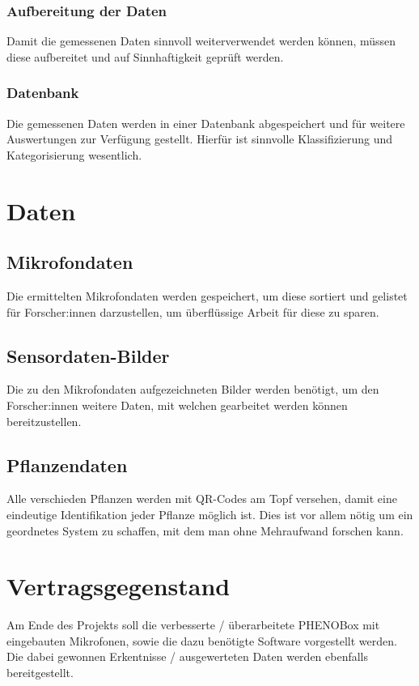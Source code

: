 \documentclass[12pt]{article}
\begin{document}
        \subsubsection{Aufbereitung der Daten}
        Damit die gemessenen Daten sinnvoll weiterverwendet werden können, müssen diese aufbereitet und auf Sinnhaftigkeit geprüft werden.
        \subsubsection{Datenbank}
        Die gemessenen Daten werden in einer Datenbank abgespeichert und für weitere Auswertungen zur Verfügung gestellt. Hierfür ist sinnvolle \Gls{Klassifizierung} und Kategorisierung wesentlich.
    
\section{Daten}
    \subsection{Mikrofondaten}
    Die ermittelten Mikrofondaten werden gespeichert, um diese sortiert und gelistet für Forscher:innen darzustellen, um überflüssige Arbeit für diese zu sparen.
    \subsection{Sensordaten-Bilder}
    Die zu den Mikrofondaten aufgezeichneten Bilder werden benötigt, um den Forscher:innen weitere Daten, mit welchen gearbeitet werden können bereitzustellen. 
    \subsection{Pflanzendaten}
    Alle verschieden Pflanzen werden mit QR-Codes am Topf versehen, damit eine eindeutige Identifikation jeder Pflanze möglich ist. Dies ist vor allem nötig um ein geordnetes System zu schaffen, mit dem man ohne Mehraufwand forschen kann.
    
\section{Vertragsgegenstand}
Am Ende des Projekts soll die verbesserte / überarbeitete \Gls{PHENOBox} mit eingebauten Mikrofonen, sowie die dazu benötigte Software vorgestellt werden. Die dabei gewonnen Erkentnisse / ausgewerteten Daten werden ebenfalls bereitgestellt.  

\clearpage


\printglossaries
\end{document}
